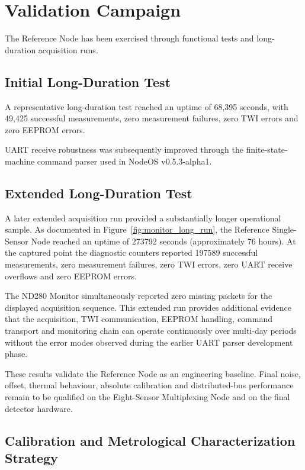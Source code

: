\chapter{Validation Campaign}

The Reference Node has been exercised through functional tests and long-duration acquisition runs.

\section{Initial Long-Duration Test}

A representative long-duration test reached an uptime of 68,395 seconds, with 49,425 successful measurements, zero measurement failures, zero TWI errors and zero EEPROM errors.

UART receive robustness was subsequently improved through the finite-state-machine command parser used in NodeOS v0.5.3-alpha1.

\section{Extended Long-Duration Test}

A later extended acquisition run provided a substantially longer operational sample. As documented in Figure~\ref{fig:monitor_long_run}, the Reference Single-Sensor Node reached an uptime of 273792 seconds (approximately 76 hours). At the captured point the diagnostic counters reported 197589 successful measurements, zero measurement failures, zero TWI errors, zero UART receive overflows and zero EEPROM errors.

The ND280 Monitor simultaneously reported zero missing packets for the displayed acquisition sequence. This extended run provides additional evidence that the acquisition, TWI communication, EEPROM handling, command transport and monitoring chain can operate continuously over multi-day periods without the error modes observed during the earlier UART parser development phase.

These results validate the Reference Node as an engineering baseline. Final noise, offset, thermal behaviour, absolute calibration and distributed-bus performance remain to be qualified on the Eight-Sensor Multiplexing Node and on the final detector hardware.

\section{Calibration and Metrological Characterization Strategy}


